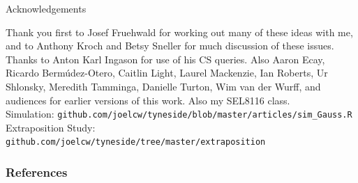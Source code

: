 \documentclass[hyperref={pdfpagelabels=false}]{beamer}
\begin{document}
\begin{frame}{Acknowledgements}
\begin{center}
Thank you first to Josef Fruehwald for working out many of these ideas with me, and to Anthony Kroch and Betsy Sneller for much discussion of these issues. Thanks to Anton Karl Ingason for use of his CS queries. Also Aaron Ecay, Ricardo Bermúdez-Otero, Caitlin Light, Laurel Mackenzie, Ian Roberts, Ur Shlonsky, Meredith Tamminga, Danielle Turton, Wim van der Wurff, and audiences for earlier versions of this work. Also my SEL8116 class.
\vspace{5mm}\\
Simulation: \texttt{github.com/joelcw/tyneside/blob/master/articles/sim\_Gauss.R}
\vspace{1mm}\\
Extraposition Study: \texttt{github.com/joelcw/tyneside/tree/master/extraposition}
\end{center}
\end{frame}


\begin{frame}[allowframebreaks]
\frametitle{References}
\newcommand*{\newblock}{natbib}


\end{frame}
\end{document}
